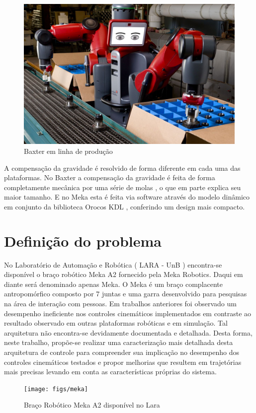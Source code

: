 \begin{figure}[H]
    \centering
    \includegraphics[width = 0.6\linewidth]{tex/figs/baxter_production.jpg}
    \caption{Baxter em linha de produção}
    \label{fig:baxter}
\end{figure}

A compensação da gravidade é resolvido de forma diferente em cada uma das plataformas. No Baxter a compensação da gravidade é feita de forma completamente mecânica por uma série de molas \cite{nobody}, o que em parte explica seu maior tamanho. E no Meka esta é feita via software através do modelo dinâmico em conjunto da biblioteca Orocos KDL \cite{mekaguide}, conferindo um design mais compacto.


\section{Definição do problema}

No Laboratório de Automação e Robótica ( LARA - UnB ) encontra-se disponível o braço robótico Meka A2 fornecido pela Meka Robotics. Daqui em diante será denominado apenas Meka. O Meka é um braço complacente antropomórfico composto por 7 juntas e uma garra desenvolvido para pesquisas na área de interação com pessoas. Em trabalhos anteriores foi observado um desempenho ineficiente nos controles cinemáticos implementados em contraste ao resultado observado em outras plataformas robóticas e em simulação. Tal arquitetura não encontra-se devidamente documentada e detalhada. Desta forma, neste trabalho, propõe-se realizar uma caracterização mais detalhada desta arquitetura de controle para compreender sua implicação no desempenho dos controles cinemáticos testados e propor melhorias que resultem em trajetórias mais precisas levando em conta as características próprias do sistema.

\begin{figure}[H]
    \centering
    \texttt{[image: figs/meka]}
    \caption{Braço Robótico Meka A2 disponível no Lara \cite{marcosps2016}}
    \label{fig:meka_arm}
\end{figure}

